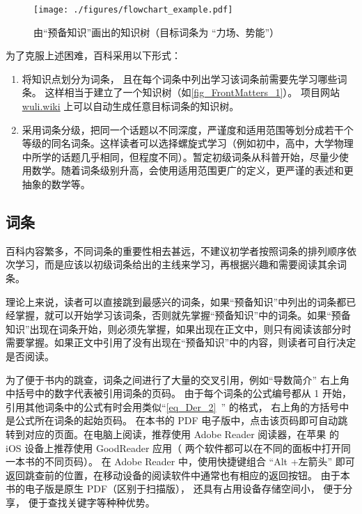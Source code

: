 \begin{figure}[ht]
\centering
\texttt{[image: ./figures/flowchart\_example.pdf]}
\caption{由“预备知识”画出的知识树（目标词条为 “力场、势能”）}\label{fig_FrontMatters_1}
\end{figure}

为了克服上述困难，百科采用以下形式：
\begin{enumerate}
\item 将知识点划分为词条， 且在每个词条中列出学习该词条前需要先学习哪些词条。 这样相当于建立了一个知识树（如\autoref{fig_FrontMatters_1}）。 项目网站 \href{https://wuli.wiki}{wuli.wiki} 上可以自动生成任意目标词条的知识树。
\item 采用词条分级，把同一个话题以不同深度，严谨度和适用范围等划分成若干个等级的同名词条。这样读者可以选择螺旋式学习（例如初中，高中，大学物理中所学的话题几乎相同，但程度不同）。暂定初级词条从科普开始，尽量少使用数学。随着词条级别升高，会使用适用范围更广的定义，更严谨的表述和更抽象的数学等。
\end{enumerate}

\subsection{词条}
百科内容繁多，不同词条的重要性相去甚远，不建议初学者按照词条的排列顺序依次学习，而是应该以初级词条给出的主线来学习，再根据兴趣和需要阅读其余词条。

理论上来说，读者可以直接跳到最感兴的词条，如果“预备知识”中列出的词条都已经掌握，就可以开始学习该词条，否则就先掌握“预备知识”中的词条。如果“预备知识”出现在词条开始，则必须先掌握，如果出现在正文中，则只有阅读该部分时需要掌握。如果正文中引用了没有出现在“预备知识”中的内容，则读者可自行决定是否阅读。

为了便于书内的跳查，词条之间进行了大量的交叉引用，例如“导数简介” 右上角中括号中的数字代表被引用词条的页码。 由于每个词条的公式编号都从 1 开始， 引用其他词条中的公式有时会用类似“\autoref{eq_Der_2}~” 的格式， 右上角的方括号中是公式所在词条的起始页码。 在本书的 PDF 电子版中，点击该页码即可自动跳转到对应的页面。在电脑上阅读，推荐使用 Adobe Reader 阅读器，在苹果\textsuperscript{\textregistered} 的 iOS 设备上推荐使用 GoodReader 应用（ 两个软件都可以在不同的面板中打开同一本书的不同页码）。 在 Adobe Reader 中，使用快捷键组合 “Alt +左箭头” 即可返回跳查前的位置，在移动设备的阅读软件中通常也有相应的返回按钮。 由于本书的电子版是原生 PDF（区别于扫描版）， 还具有占用设备存储空间小， 便于分享， 便于查找关键字等种种优势。
